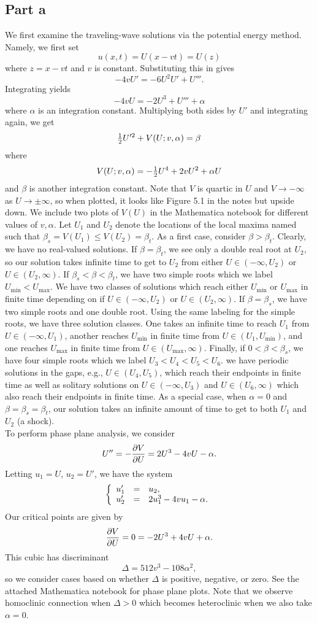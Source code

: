 \documentclass{article}
\begin{document}
\subsection{Part a}
We first examine the traveling-wave solutions via the potential energy method. Namely, we first set 
\[
u(x,t)=U(x-vt)=U(z)
\]
where $z=x-vt$ and $v$ is constant. Substituting this in gives
\[
-4vU'=-6U^2U'+U'''.
\]
Integrating yields
\[
-4vU=-2U^3+U'''+\alpha
\]
where $\alpha$ is an integration constant. Multiplying both sides by $U'$ and integrating again, we get 
\[
\mbox{$\frac{1}{2}$} U'^2+V(U;v,\alpha)=\beta
\]
where 
\[
V(U;v,\alpha)=-\mbox{$\frac{1}{2}$} U^4+2vU^2+\alpha U
\]
and $\beta$ is another integration constant. Note that $V$ is quartic in $U$ and $V\to-\infty$ as $U\to\pm\infty$, so when plotted, it looks like Figure 5.1 in the notes but upside down. We include two plots of $V(U)$ in the Mathematica notebook for different values of $v,\alpha$. Let $U_{1}$ and $U_{2}$ denote the locations of the local maxima named such that $\beta_s=V(U_1)\leq V(U_2)=\beta_t$. As a first case, consider $\beta>\beta_t$. Clearly, we have no real-valued solutions. If $\beta=\beta_t$, we see only a double real root at $U_2$, so our solution takes infinite time to get to $U_2$ from either $U\in(-\infty,U_2)$ or $U\in(U_2,\infty)$. If $\beta_s<\beta<\beta_t$, we have two simple roots which we label $U_{\text{min}}<U_{\text{max}}$. We have two classes of solutions which reach either  $U_{\text{min}}$ or $U_{\text{max}}$ in finite time depending on if $U\in(-\infty,U_2)$ or $U\in(U_2,\infty)$. If $\beta=\beta_s$, we have two simple roots and one double root. Using the same labeling for the simple roots, we have three solution classes. One takes an infinite time to reach $U_1$ from $U\in(-\infty,U_1)$, another reaches $U_{\text{min}}$ in finite time from $U\in(U_1,U_{\text{min}})$, and one reaches $U_{\text{max}}$ in finite time from $U\in(U_{\text{max}},\infty)$. Finally, if $0<\beta<\beta_s$, we have four simple roots which we label $U_3<U_4<U_5<U_6$. we have periodic solutions in the gaps, e.g., $U\in(U_4,U_5)$, which reach their endpoints in finite time as well as solitary solutions on $U\in(-\infty,U_3)$ and $U\in(U_6,\infty)$ which also reach their endpoints in finite time. As a special case, when $\alpha=0$ and $\beta=\beta_s=\beta_t$, our solution takes an infinite amount of time to get to both $U_1$ and $U_2$ (a shock).\\
To perform phase plane analysis, we consider
\[
U''=-\frac{\partial V}{\partial U}=2U^3-4vU-\alpha.
\]
Letting $u_1=U$, $u_2=U'$, we have the system 
\[
\left\{\begin{array}{rcl}
	u_1'&=&u_2, \\
	u_2'&=&2u_1^3-4vu_1-\alpha.
\end{array}\right.
\]
Our critical points are given by
\[
\frac{\partial V}{\partial U}=0=-2U^3+4vU+\alpha.
\]
This cubic has discriminant 
\[
\Delta=512v^3-108\alpha^2,
\]
so we consider cases based on whether $\Delta$ is positive, negative, or zero. See the attached Mathematica notebook for phase plane plots. Note that we observe homoclinic connection when $\Delta>0$ which becomes heteroclinic when we also take $\alpha=0$.
\end{document}
